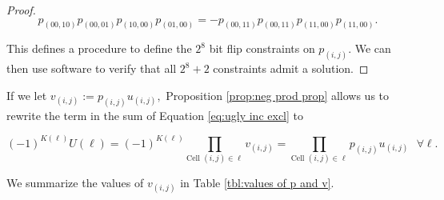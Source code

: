 \documentclass[12pt]{article}
\theoremstyle{plain}
\theoremstyle{definition}
\theoremstyle{remark}
\theoremstyle{definition}
\begin{document}
\begin{proof}
\begin{equation}
    p_{(00,10)}p_{(00,01)}p_{(10,00)}p_{(01,00)} = -p_{(00,11)}p_{(00,11)}p_{(11,00)}p_{(11,00)}.
\end{equation}

This defines a procedure to define the $2^8$ bit flip constraints on $p_{(i,j)}$. We can then use software to verify that all $2^8 +2$ constraints admit a solution.



\end{proof}

If we let $v_{(i,j)} := p_{(i,j)}u_{(i,j)},$ Proposition \ref{prop:neg prod prop} allows us to rewrite the term in the sum of Equation \ref{eq:ugly inc excl} to

\begin{equation}
    (-1)^{K(\ell)}U(\ell) = (-1)^{K(\ell)} \prod_{\text{Cell }(i,j) \in \ell} v_{(i,j)} = \prod_{\text{Cell }(i,j) \in \ell} p_{(i,j)}u_{(i,j)} \text{ $\forall \ell$}.
    \label{eq:term fix}
\end{equation}

We summarize the values of $v_{(i,j)}$ in Table \ref{tbl:values of p and v}.
\end{document}
